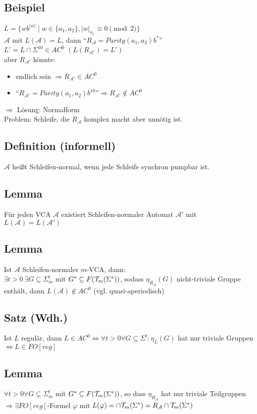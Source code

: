     \subsection{Beispiel}
        $L=\{wb^{|w|}\mid w\in\{a_1,a_2\},|w|_{a_1}\equiv 0\pmod 2\}$\\
        $\mathcal{A}$ mit $L(\mathcal{A})=L$, dann ``$R_\mathcal{A}=Parity(a_1,a_2)b^*$''\\
        $L'=L\cap\Sigma^{10}\in AC^0$ $(L(R_{\mathcal{A}'})=L')$\\
        aber $R_{\mathcal{A}'}$ könnte:
        \begin{itemize}
            \item endlich sein $\Rightarrow R_{\mathcal{A}'}\in AC^0$
            \item ``$R_{\mathcal{A}'}=Parity(a_1,a_2)b^{10}$''$\Rightarrow R_{\mathcal{A}'}\not\in AC^0$
        \end{itemize}
        $\Rightarrow$ Lösung: Normalform\\
        Problem: Schleife, die $R_\mathcal{A}$ komplex macht aber unnötig ist.
    \subsection{Definition (informell)}
        $\mathcal{A}$ heißt Schleifen-normal, wenn jede Schleife synchron pumpbar ist.
    \subsection{Lemma}
        Für jeden VCA $\mathcal {A}$ existiert Schleifen-normaler Automat $\mathcal{A}'$ mit $L(\mathcal{A})=L(\mathcal{A}')$
    \subsection{Lemma}
        Ist $\mathcal{A}$ Schleifen-normaler $m$-VCA, dann:\\
        $\exists t>0\ \exists G\subseteq\Sigma^t_m$ mit $G^*\subseteq F(\mathcal{T}_m(\Sigma^*))$, sodass $\eta_{R_\mathcal{A}}(G)$ nicht-triviale Gruppe enthält, dann $L(\mathcal{A})\not\in AC^0$ (vgl. quasi-aperiodisch)
    \subsection{Satz (Wdh.)}
        Ist $L$ regulär, dann $L\in AC^0\Leftrightarrow\forall t>0\forall G\subseteq\Sigma^t:\eta_L(G)$ hat nur triviale Gruppen $\Leftrightarrow L\in FO[reg]$
    \subsection{Lemma}
        $\forall t>0\forall G\subseteq\Sigma_m^t$ mit $G^*\subseteq F(\mathcal{T}_m(\Sigma^*))$, so dass $\eta_{R_\mathcal{A}}$ hat nur triviale Teilgruppen $\Rightarrow\exists FO[reg]$-Formel $\varphi$ mit $L(\varphi)=\cap\mathcal{T}_m(\Sigma^*)=R_\mathcal{A}\cap\mathcal{T}_m(\Sigma^*)$
